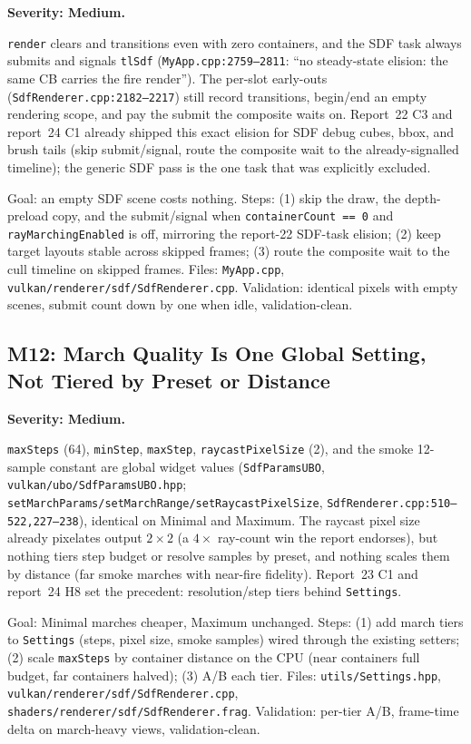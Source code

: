 \documentclass[11pt,a4paper]{article}
\begin{document}
\textbf{Severity: Medium.}

\texttt{render} clears and transitions even with zero containers, and the SDF
task always submits and signals \texttt{tlSdf}
(\texttt{MyApp.cpp:2759--2811}: ``no steady-state elision: the same CB
carries the fire render''). The per-slot early-outs
(\texttt{SdfRenderer.cpp:2182--2217}) still record transitions, begin/end an
empty rendering scope, and pay the submit the composite waits on. Report~22
C3 and report~24 C1 already shipped this exact elision for SDF debug cubes,
bbox, and brush tails (skip submit/signal, route the composite wait to the
already-signalled timeline); the generic SDF pass is the one task that was
explicitly excluded.

\begin{tcolorbox}[promptbox={Prompt --- M11: content-gated SDF submit}]
Goal: an empty SDF scene costs nothing. Steps: (1) skip the draw, the
depth-preload copy, and the submit/signal when \texttt{containerCount == 0}
and \texttt{rayMarchingEnabled} is off, mirroring the report-22 SDF-task
elision; (2) keep target layouts stable across skipped frames; (3) route the
composite wait to the cull timeline on skipped frames. Files:
\texttt{MyApp.cpp}, \texttt{vulkan/renderer/sdf/SdfRenderer.cpp}.
Validation: identical pixels with empty scenes, submit count down by one when
idle, validation-clean.
\end{tcolorbox}

\subsection{M12: March Quality Is One Global Setting, Not Tiered by Preset or Distance}

\textbf{Severity: Medium.}

\texttt{maxSteps} (64), \texttt{minStep}, \texttt{maxStep},
\texttt{raycastPixelSize} (2), and the smoke 12-sample constant are global
widget values (\texttt{SdfParamsUBO}, \texttt{vulkan/ubo/SdfParamsUBO.hpp};
\texttt{setMarchParams/setMarchRange/setRaycastPixelSize},
\texttt{SdfRenderer.cpp:510--522,227--238}), identical on Minimal and
Maximum. The raycast pixel size already pixelates output $2\times2$ (a
$4\times$ ray-count win the report endorses), but nothing tiers step budget
or resolve samples by preset, and nothing scales them by distance (far smoke
marches with near-fire fidelity). Report~23 C1 and report~24 H8 set the
precedent: resolution/step tiers behind \texttt{Settings}.

\begin{tcolorbox}[promptbox={Prompt --- M12: tiered march quality}]
Goal: Minimal marches cheaper, Maximum unchanged. Steps: (1) add march tiers
to \texttt{Settings} (steps, pixel size, smoke samples) wired through the
existing setters; (2) scale \texttt{maxSteps} by container distance on the CPU
(near containers full budget, far containers halved); (3) A/B each tier.
Files: \texttt{utils/Settings.hpp},
\texttt{vulkan/renderer/sdf/SdfRenderer.cpp},
\texttt{shaders/renderer/sdf/SdfRenderer.frag}. Validation: per-tier A/B,
frame-time delta on march-heavy views, validation-clean.
\end{tcolorbox}
\end{document}
